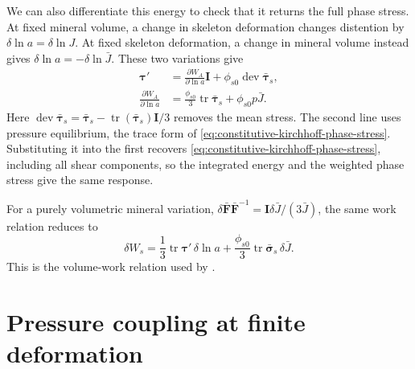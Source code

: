 \documentclass[11pt]{article}
\newcommand{\tr}{\operatorname{tr}}
\newcommand{\dev}{\operatorname{dev}}
\newcommand{\pder}[2]{\frac{\partial #1}{\partial #2}}
\begin{document}
We can also differentiate this energy to check that it returns the full
phase stress. At fixed mineral volume, a change in skeleton deformation
changes distention by \(\delta\ln a=\delta\ln J\). At fixed skeleton
deformation, a change in mineral volume instead gives
\(\delta\ln a=-\delta\ln\bar J\). These two variations give
\begin{align}
 \mathbf\tau'&=\pder{W_A}{\ln a}\mathbf I
                         +\phi_{s0}\dev\bar{\mathbf\tau}_s,
 \label{eq:energy-returned-effective-stress}\\
 \pder{W_A}{\ln a}
 &=\frac{\phi_{s0}}3\tr\bar{\mathbf\tau}_s+\phi_{s0}p\bar J.
 \label{eq:energy-returned-pressure-balance}
\end{align}
Here \(\dev\bar{\mathbf\tau}_s=\bar{\mathbf\tau}_s
-\tr(\bar{\mathbf\tau}_s)\mathbf I/3\) removes the mean stress.
The second line uses pressure equilibrium, the trace form of
\eqref{eq:constitutive-kirchhoff-phase-stress}. Substituting it into the
first recovers \eqref{eq:constitutive-kirchhoff-phase-stress}, including all
shear components, so the integrated energy and the weighted phase stress
give the same response.

For a purely volumetric mineral variation,
\(\delta\bar{\mathbf F}\bar{\mathbf F}^{-1}
=\mathbf I\delta\bar J/(3\bar J)\), the same work relation reduces to
\begin{equation}
 \delta W_s=\frac13\tr\mathbf\tau'\,\delta\ln a
 +\frac{\phi_{s0}}3\tr\bar{\mathbf\sigma}_s\,\delta\bar J.
 \label{eq:equivalent-volumetric-work}
\end{equation}
This is the volume-work relation used by \citet{foster2026poroplastic}.



\section{Pressure coupling at finite deformation}
\label{sec:finite-biot}
\end{document}
